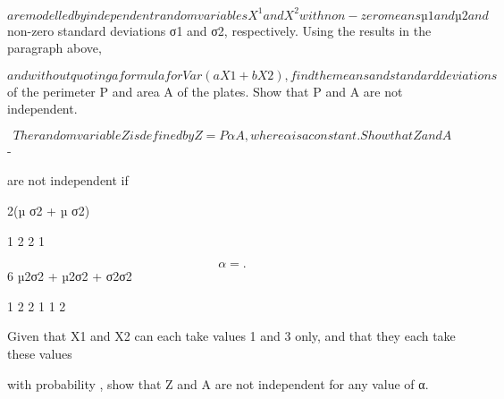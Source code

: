 \documentclass[12pt]{article}
\begin{document}
\begin{flushleft}
\[are modelled by independent random variables X^1 and X^2 with non-zero means µ1 and µ2 and\]
non-zero standard deviations σ1 and σ2, respectively. Using the results in the paragraph above,\par
\[and without quoting a formula for Var (aX1 + bX2), find the means and standard deviations\]
of the perimeter P and area A of the plates. Show that P and A are not independent.\par
\[The random variable Z is defined by Z = P αA, where α is a constant. Show that Z and A\]
-\par
are not independent if\par
2(µ σ2 + µ σ2)\par
1 2 2 1\par
\[α = .\]
6 µ2σ2 + µ2σ2 + σ2σ2\par
1 2 2 1 1 2\par
Given that X1 and X2 can each take values 1 and 3 only, and that they each take these values\par
with probability , show that Z and A are not independent for any value of α.\par
\end{flushleft}
\end{document}
